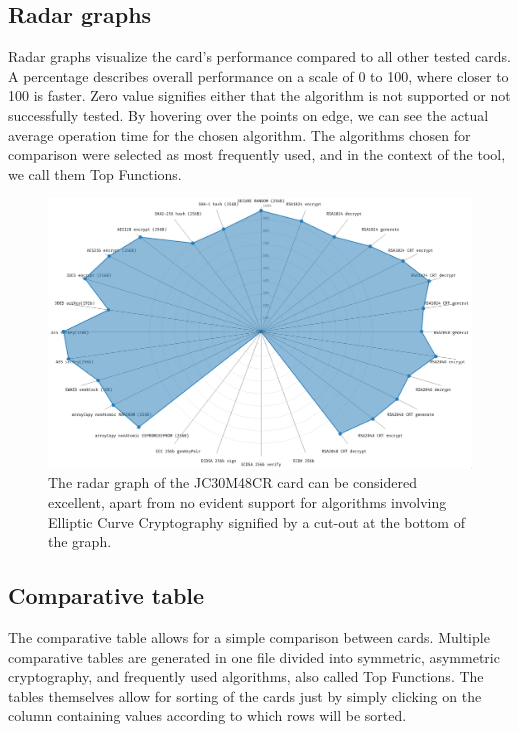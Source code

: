 \subsection{Radar graphs}
Radar graphs visualize the card's performance compared to all other tested cards. A percentage describes overall performance on a scale of 0 to 100, where closer to 100 is faster. Zero value signifies either that the algorithm is not supported or not successfully tested. By hovering over the points on edge, we can see the actual average operation time for the chosen algorithm. The algorithms chosen for comparison were selected as most frequently used, and in the context of the tool, we call them Top Functions. 

\begin{figure}[H]
    \centering
    \includegraphics[width=\textwidth]{img/JC30M48CR radar graph.png}
    \caption{
    The radar graph of the JC30M48CR card  can be considered excellent, apart from no evident support for algorithms involving Elliptic Curve Cryptography signified by a cut-out at the bottom of the graph.
    }
    \label{fig:radar-graph}
\end{figure}

\subsection{Comparative table}
The comparative table allows for a simple comparison between cards. Multiple comparative tables are generated in one file divided into symmetric, asymmetric cryptography, and frequently used algorithms, also called Top Functions. The tables themselves allow for sorting of the cards just by simply clicking on the column containing values according to which rows will be sorted.

